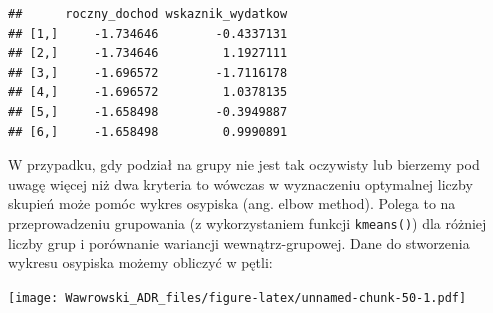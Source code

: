 \documentclass[]{book}
\newenvironment{Shaded}{\begin{snugshade}}{\end{snugshade}}
\newcommand{\CommentTok}[1]{\textcolor[rgb]{0.56,0.35,0.01}{\textit{#1}}}
\newcommand{\ControlFlowTok}[1]{\textcolor[rgb]{0.13,0.29,0.53}{\textbf{#1}}}
\newcommand{\DataTypeTok}[1]{\textcolor[rgb]{0.13,0.29,0.53}{#1}}
\newcommand{\DecValTok}[1]{\textcolor[rgb]{0.00,0.00,0.81}{#1}}
\newcommand{\KeywordTok}[1]{\textcolor[rgb]{0.13,0.29,0.53}{\textbf{#1}}}
\newcommand{\NormalTok}[1]{#1}
\newcommand{\OperatorTok}[1]{\textcolor[rgb]{0.81,0.36,0.00}{\textbf{#1}}}
\newcommand{\StringTok}[1]{\textcolor[rgb]{0.31,0.60,0.02}{#1}}
\begin{document}
\begin{Shaded}
\end{Shaded}

\begin{verbatim}
##      roczny_dochod wskaznik_wydatkow
## [1,]     -1.734646        -0.4337131
## [2,]     -1.734646         1.1927111
## [3,]     -1.696572        -1.7116178
## [4,]     -1.696572         1.0378135
## [5,]     -1.658498        -0.3949887
## [6,]     -1.658498         0.9990891
\end{verbatim}

W przypadku, gdy podział na grupy nie jest tak oczywisty lub bierzemy pod uwagę więcej niż dwa kryteria to wówczas w wyznaczeniu optymalnej liczby skupień może pomóc wykres osypiska (ang. elbow method). Polega to na przeprowadzeniu grupowania (z wykorzystaniem funkcji \texttt{kmeans()}) dla różniej liczby grup i porównanie wariancji wewnątrz-grupowej. Dane do stworzenia wykresu osypiska możemy obliczyć w pętli:

\begin{Shaded}
\end{Shaded}

\texttt{[image: Wawrowski\_ADR\_files/figure-latex/unnamed-chunk-50-1.pdf]}
\end{document}
